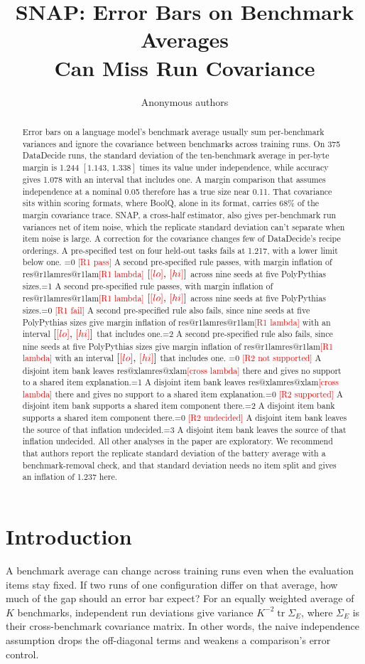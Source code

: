 \documentclass{article}
\title{SNAP: Error Bars on Benchmark Averages\\Can Miss Run Covariance}
\author{Anonymous authors}
\makeatletter
\newcommand{\ci}[2]{\ensuremath{[#1,\,#2]}}
\newcommand{\Sig}{\Sigma_E}
\newcommand{\pending}[1]{\textcolor{red}{[#1]}}
\newcommand{\Ronecase}{0}
\newcommand{\Rtwocase}{0}
\newcommand{\outcome}[4]{\ifnum#1=0 \pending{#3} #4\else\ifnum#1=#2 #4\fi\fi}
\newcommand{\res}[2]{\ifcsname res@#1\endcsname\csname res@#1\endcsname\else\pending{#2}\fi}
\makeatother
\begin{document}
\maketitle
\begin{abstract}
Error bars on a language model's benchmark average usually sum per-benchmark variances and ignore the covariance between benchmarks across training runs. On 375 DataDecide runs, the standard deviation of the ten-benchmark average in per-byte margin is 1.244 \ci{1.143}{1.338} times its value under independence, while accuracy gives 1.078 with an interval that includes one. A margin comparison that assumes independence at a nominal 0.05 therefore has a true size near 0.11. That covariance sits within scoring formats, where BoolQ, alone in its format, carries 68\% of the margin covariance trace. SNAP, a cross-half estimator, also gives per-benchmark run variances net of item noise, which the replicate standard deviation can't separate when item noise is large. A correction for the covariance changes few of DataDecide's recipe orderings. A pre-specified test on four held-out tasks fails at 1.217, with a lower limit below one. \outcome{\Ronecase}{1}{R1 pass}{A second pre-specified rule passes, with margin inflation of \res{r1lam}{R1 lambda} \ci{\res{r1lo}{lo}}{\res{r1hi}{hi}} across nine seeds at five PolyPythias sizes.}\outcome{\Ronecase}{2}{R1 fail}{A second pre-specified rule also fails, since nine seeds at five PolyPythias sizes give margin inflation of \res{r1lam}{R1 lambda} with an interval \ci{\res{r1lo}{lo}}{\res{r1hi}{hi}} that includes one.} \outcome{\Rtwocase}{1}{R2 not supported}{A disjoint item bank leaves \res{xlam}{cross lambda} there and gives no support to a shared item explanation.}\outcome{\Rtwocase}{2}{R2 supported}{A disjoint item bank supports a shared item component there.}\outcome{\Rtwocase}{3}{R2 undecided}{A disjoint item bank leaves the source of that inflation undecided.} All other analyses in the paper are exploratory. We recommend that authors report the replicate standard deviation of the battery average with a benchmark-removal check, and that standard deviation needs no item split and gives an inflation of 1.237 here.
\end{abstract}

\section{Introduction}
A benchmark average can change across training runs even when the evaluation items stay fixed. If two runs of one configuration differ on that average, how much of the gap should an error bar expect? For an equally weighted average of $K$ benchmarks, independent run deviations give variance $K^{-2}\operatorname{tr}\Sig$, where $\Sig$ is their cross-benchmark covariance matrix. In other words, the naive independence assumption drops the off-diagonal terms and weakens a comparison's error control.
\end{document}
